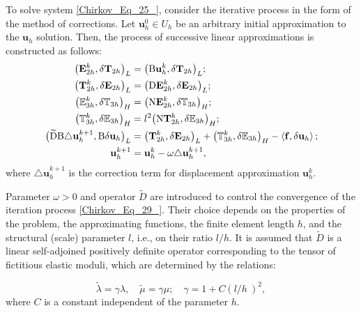 To solve system \eqref{Chirkov_Eq_25_}, consider the iterative process in the form of the method of corrections. Let ${{\mathbf u}}_h^0\in U_h$ be an arbitrary initial approximation to the ${{\mathbf u}}_h$ solution. Then, the process of successive linear approximations is constructed as follows:
\begin{equation} \label{Chirkov_Eq_29_} 
	\begin{aligned}
		{\left({{\mathbf E}}^k_{2h},\delta {{\mathbf T}}_{2h}\right)}_L&={\left({\rm B}{{\mathbf u}}^k_h,\delta {{\mathbf T}}_{2h}\right)}_L;
		\\
		{\left({{\mathbf T}}^k_{2h},\delta {{\mathbf E}}_{2h}\right)}_L&={\left({\rm D}{{\mathbf E}}^k_{2h},\delta {{\mathbf E}}_{2h}\right)}_L;
		\\
		{\big({{\mathbb E}}^k_{3h},\delta {{\mathbb T}}_{3h}\big)}_H&={\left({\rm N}{{\mathbf E}}^k_{2h},\delta {{\mathbb T}}_{3h}\right)}_H;
		\\
		{\big({{\mathbb T}}^k_{3h},\delta {{\mathbb E}}_{3h}\big)}_H&=l^2{\left({\rm N}{{\mathbf T}}^k_{2h},\delta {{\mathbb E}}_{3h}\right)}_H;
		\\
		{\big(\widetilde{{\rm D}}{\rm B}{\triangle {\mathbf u}}^{k+1}_h,{{\rm B}\delta {\mathbf u}}_h\big)}_L&={\left({{\mathbf T}}^k_{2h},\delta {{\mathbf E}}_{2h}\right)}_L+{\big({{\mathbb T}}^k_{3h},\delta {{\mathbb E}}_{3h}\big)}_H-\left\langle {\mathbf f},{\delta {\mathbf u}}_h\right\rangle ;
		\\ 
		{{\mathbf u}}^{k+1}_h&={{\mathbf u}}^k_h-\omega{\triangle {\mathbf u}}^{k+1}_h,
	\end{aligned}
\end{equation}  
where ${\triangle {\mathbf u}}_h^{k+1}$ is the correction term for displacement approximation ${{\mathbf u}}_h^k$.

Parameter $\omega>0$ and operator $\tilde{D}$ are introduced to control the convergence of the iteration process \eqref{Chirkov_Eq_29_}. Their choice depends on the properties of the problem, the approximating functions, the finite element length $h$, and the structural (scale) parameter $l$, i.e., on their ratio ${l}/{h}$. It is assumed that $\tilde{D}$ is a linear self-adjoined positively definite operator corresponding to the tensor of fictitious elastic moduli, which are determined by the relations:

\begin{equation} \label{Chirkov_Eq_30_} 
	\tilde{\lambda}=\gamma\lambda,\quad \tilde{\mu}=\gamma\mu;\quad \gamma=1+C{\left({l}/{h}\ \right)}^2, 
\end{equation} 
where $C$ is a constant independent of the parameter $h$.

